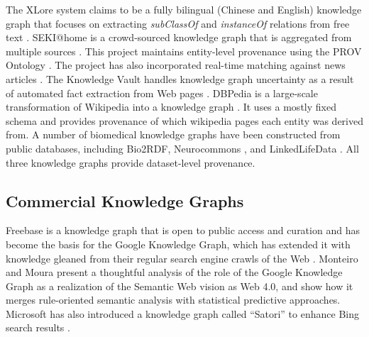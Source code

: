 The XLore system claims to be a fully bilingual (Chinese and English) knowledge graph that focuses on extracting \emph{subClassOf} and \emph{instanceOf} relations from free text \cite{wang2013xlore}.
SEKI@home is a crowd-sourced knowledge graph that is aggregated from multiple sources \cite{steiner2012seki}.
This project maintains entity-level provenance using the PROV Ontology \cite{Moreau_2015}.
The project has also incorporated real-time matching against news articles \cite{steiner_iswc_2012}.
The Knowledge Vault handles knowledge graph uncertainty as a result of automated fact extraction from Web pages \cite{Dong_2014}.
DBPedia is a large-scale transformation of Wikipedia into a knowledge graph \cite{Bizer_2009}.
It uses a mostly fixed schema and provides provenance of which wikipedia pages each entity was derived from.
A number of biomedical knowledge graphs have been constructed from public databases, including Bio2RDF\cite{Callahan_2013}, Neurocommons \cite{Ruttenberg_2009}, and LinkedLifeData \cite{momtchev2009expanding}.
All three knowledge graphs provide dataset-level provenance.

\subsection{Commercial Knowledge Graphs}
Freebase is a knowledge graph that is open to public access and curation \cite{Bollacker_2008} and has become the basis for the Google Knowledge Graph, which has extended it with knowledge gleaned from their regular search engine crawls of the Web \cite{singhal2012introducing}.
Monteiro and Moura \cite{10110943220141101} present a thoughtful analysis of the role of the Google Knowledge Graph as a realization of the Semantic Web vision \cite{bernerslee2000semantic} as Web 4.0, and show how it merges rule-oriented semantic analysis with statistical predictive approaches.
Microsoft has also introduced a knowledge graph called ``Satori'' to enhance Bing search results \cite{qian2013understand}.
